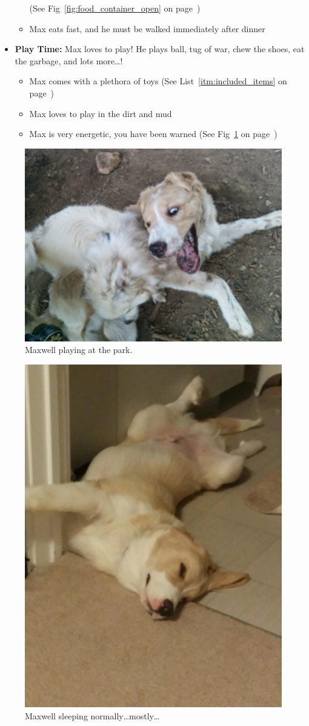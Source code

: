 \documentclass[pdftex,12pt]{article}
\begin{document}
\begin{itemize}
\begin{itemize}
                (See Fig~\ref{fig:food_container_open} on
                page~\pageref{fig:food_container_open})
            \item Max eats fast, and he must be walked immediately after dinner
        \end{itemize}
    \item \textbf{Play Time:} Max loves to play! He plays ball, tug of war, chew
        the shoes, eat the garbage, and lots more\ldots!
        \begin{itemize}
            \item Max comes with a plethora of toys
                (See List~\ref{itm:included_items} on
                page~\pageref{itm:included_items})
            \item Max loves to play in the dirt and mud
            \item Max is very energetic, you have been warned
                (See Fig~\ref{fig:at_the_park} on
                page~\pageref{fig:at_the_park})
        \end{itemize}
\end{itemize}

\bigskip

\begin{figure}[h!]
    \centering
    \includegraphics[width=.35\textwidth]{./images/max/at_the_park.jpg}
    \caption{Maxwell playing at the park.}
    \label{fig:at_the_park}
\end{figure}

\bigskip

\begin{figure}[h!]
    \centering
    \includegraphics[width=.35\textwidth]{./images/max/sleeping.jpg}
    \caption{Maxwell sleeping normally\ldots mostly\ldots}
    \label{fig:sleeping}
\end{figure}
\end{document}
